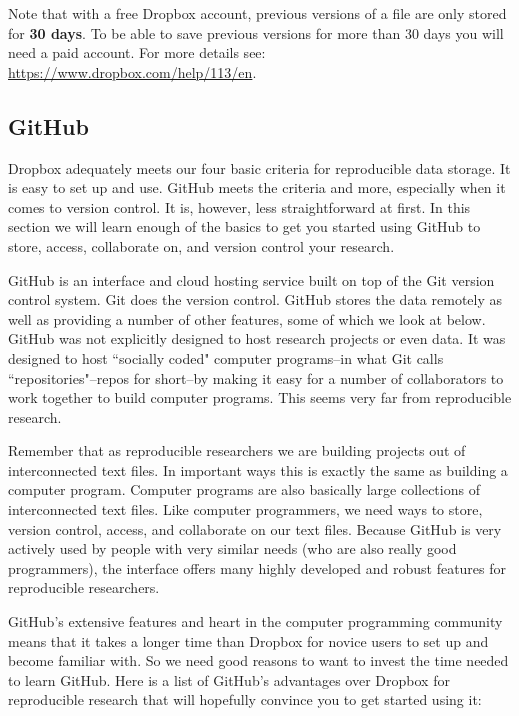 Note that with a free Dropbox account, previous versions of a file are only stored for \textbf{30 days}. To be able to save previous versions for more than 30 days you will need a paid account. For more details see: \url{https://www.dropbox.com/help/113/en}.

\subsection{GitHub}

Dropbox adequately meets our four basic criteria for reproducible data storage. It is easy to set up and use. GitHub meets the criteria and more, especially when it comes to version control. It is, however, less straightforward at first. In this section we will learn enough of the basics to get you started using GitHub to store, access, collaborate on, and version control your research.

GitHub is an interface and cloud hosting service built on top of the Git version control system. Git does the version control. GitHub stores the data remotely as well as providing a number of other features, some of which we look at below. GitHub was not explicitly designed to host research projects or even data. It was designed to host ``socially coded" computer programs--in what Git calls ``repositories"--repos for short--by making it easy for a number of collaborators to work together to build computer programs. This seems very far from reproducible research.

Remember that as reproducible researchers we are building projects out of interconnected text files. In important ways this is exactly the same as building a computer program. Computer programs are also basically large collections of interconnected text files. Like computer programmers, we need ways to store, version control, access, and collaborate on our text files. Because GitHub is very actively used by people with very similar needs (who are also really good programmers), the interface offers many highly developed and robust features for reproducible researchers.

GitHub's extensive features and heart in the computer programming community means that it takes a longer time than Dropbox for novice users to set up and become familiar with. So we need good reasons to want to invest the time needed to learn GitHub. Here is a list of GitHub's advantages over Dropbox for reproducible research that will hopefully convince you to get started using it: \\[0.25cm]

